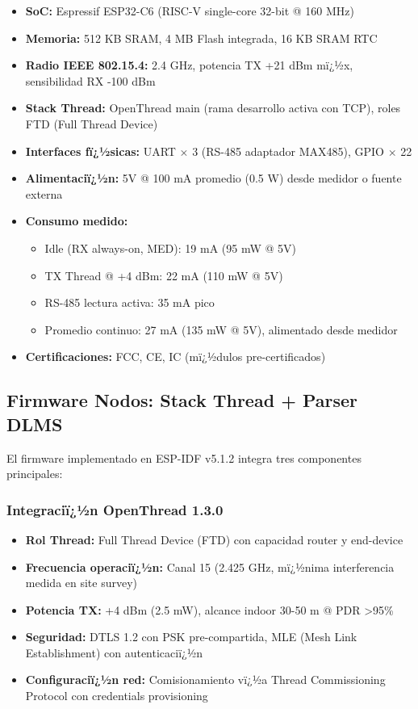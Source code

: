 \begin{itemize}
    \item \textbf{SoC:} Espressif ESP32-C6 (RISC-V single-core 32-bit @ 160 MHz)
    \item \textbf{Memoria:} 512 KB SRAM, 4 MB Flash integrada, 16 KB SRAM RTC
    \item \textbf{Radio IEEE 802.15.4:} 2.4 GHz, potencia TX +21 dBm mï¿½x, sensibilidad RX -100 dBm
    \item \textbf{Stack Thread:} OpenThread main (rama desarrollo activa con TCP), roles FTD (Full Thread Device)
    \item \textbf{Interfaces fï¿½sicas:} UART $\times$ 3 (RS-485 adaptador MAX485), GPIO $\times$ 22
    \item \textbf{Alimentaciï¿½n:} 5V @ 100 mA promedio (0.5 W) desde medidor o fuente externa
    \item \textbf{Consumo medido:} 
        \begin{itemize}
        \item Idle (RX always-on, MED): 19 mA (95 mW @ 5V)
        \item TX Thread @ +4 dBm: 22 mA (110 mW @ 5V)
        \item RS-485 lectura activa: 35 mA pico
        \item Promedio continuo: 27 mA (135 mW @ 5V), alimentado desde medidor
        \end{itemize}
    \item \textbf{Certificaciones:} FCC, CE, IC (mï¿½dulos pre-certificados)
\end{itemize}

\subsection{Firmware Nodos: Stack Thread + Parser DLMS}
\label{sec:impl-firmware-nodos}

El firmware implementado en ESP-IDF v5.1.2 integra tres componentes principales:

\subsubsection{Integraciï¿½n OpenThread 1.3.0}

\begin{itemize}
\item \textbf{Rol Thread:} Full Thread Device (FTD) con capacidad router y end-device
\item \textbf{Frecuencia operaciï¿½n:} Canal 15 (2.425 GHz, mï¿½nima interferencia medida en site survey)
\item \textbf{Potencia TX:} +4 dBm (2.5 mW), alcance indoor 30-50 m @ PDR >95\%
\item \textbf{Seguridad:} DTLS 1.2 con PSK pre-compartida, MLE (Mesh Link Establishment) con autenticaciï¿½n
\item \textbf{Configuraciï¿½n red:} Comisionamiento vï¿½a Thread Commissioning Protocol con credentials provisioning
\end{itemize}

